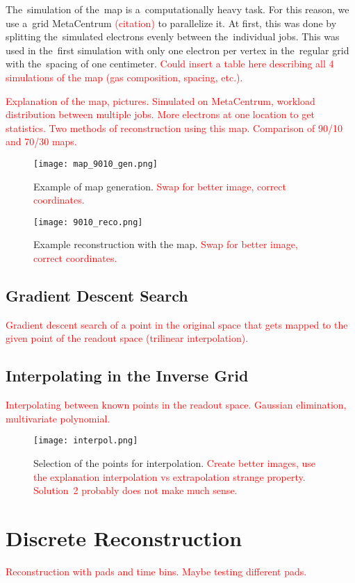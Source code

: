 		The~simulation of the~map is a~computationally heavy task. For this reason, we use a~grid MetaCentrum \textcolor{red}{(citation)} to parallelize it. At first, this was done by splitting the~simulated electrons evenly between the~individual jobs. This was used in the~first simulation with only one electron per vertex in the~regular grid with the~spacing of one centimeter. \textcolor{red}{Could insert a table here describing all 4 simulations of the map (gas composition, spacing, etc.).}
		
		\textcolor{red}{Explanation of the map, pictures. Simulated on MetaCentrum, workload distribution between multiple jobs. More electrons at one location to get statistics. Two methods of reconstruction using this map. Comparison of 90/10 and 70/30 maps.}
		
		\begin{figure}
			\centering
			\texttt{[image: map\_9010\_gen.png]}
			\caption{Example of map generation. \textcolor{red}{Swap for better image, correct coordinates.}}
			\label{fig:map9010gen}
		\end{figure}
		
		\begin{figure}
			\centering
			\texttt{[image: 9010\_reco.png]}
			\caption{Example reconstruction with the map. \textcolor{red}{Swap for better image, correct coordinates.}}
			\label{fig:9010reco}
		\end{figure}
		
		\subsection{Gradient Descent Search}
			\label{sec:grad}
			\textcolor{red}{Gradient descent search of a point in the original space that gets mapped to the given point of the readout space (trilinear interpolation).}
		
		\subsection{Interpolating in the Inverse Grid}
			\textcolor{red}{Interpolating between known points in the readout space. Gaussian elimination, multivariate polynomial.}
			
			\begin{figure}
				\centering
				\texttt{[image: interpol.png]}
				\caption{Selection of the points for interpolation. \textcolor{red}{Create better images, use the explanation interpolation vs extrapolation strange property. Solution~2 probably does not make much sense.}}
				\label{fig:interpol}
			\end{figure}
		
	\section{Discrete Reconstruction}
		\textcolor{red}{Reconstruction with pads and time bins. Maybe testing different pads.}